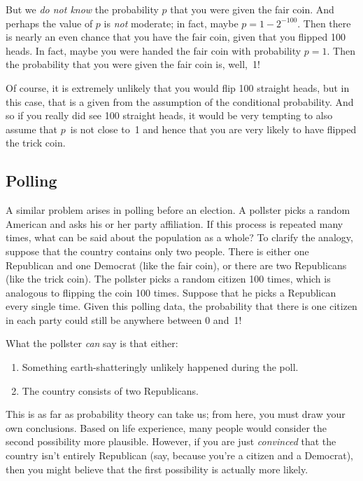 But we \emph{do not know} the probability $p$ that you were given
the fair coin.  And perhaps the value of $p$ is \emph{not} moderate;
in fact, maybe $p = 1 - 2^{-100}$.  Then there is nearly an even
chance that you have the fair coin, given that you flipped 100 heads.
In fact, maybe you were handed the fair coin with probability $p = 1$.
Then the probability that you were given the fair coin is, well,~1!

Of course, it is extremely unlikely that you would flip 100 straight
heads, but in this case, that is a given from the assumption of the
conditional probability.  And so if you really did see 100 straight
heads, it would be very tempting to also assume that $p$~is not close
to~1 and hence that you are very likely to have flipped the trick
coin.

\subsection{Polling}

A similar problem arises in polling before an election.  A pollster
picks a random American and asks his or her party affiliation.  If
this process is repeated many times, what can be said about the
population as a whole?  To clarify the analogy, suppose that the
country contains only two people.  There is either one Republican and
one Democrat (like the fair coin), or there are two Republicans (like
the trick coin).  The pollster picks a random citizen 100 times, which
is analogous to flipping the coin 100 times.  Suppose that he picks a
Republican every single time.  Given this
polling data, the probability that there is one citizen in each party
could still be anywhere between 0 and~1!

What the pollster \emph{can} say is that either:
%
\begin{enumerate}
\item Something earth-shatteringly unlikely happened during the poll.
\item The country consists of two Republicans.
\end{enumerate}
%
This is as far as probability theory can take us; from here, you must
draw your own conclusions.  Based on life experience, many people
would consider the second possibility more plausible.  However, if you
are just \emph{convinced} that the country isn't entirely Republican
(say, because you're a citizen and a Democrat), then you might believe
that the first possibility is actually more likely.

